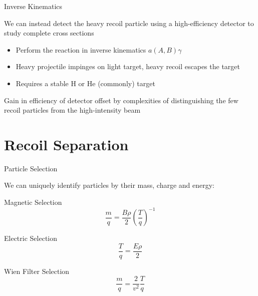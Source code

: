 \documentclass[10pt]{beamer}
\newcommand{\react}[4]{$#1(#2,#3)#4$}
\begin{document}
\begin{frame}[fragile]{Inverse Kinematics}

    We can instead detect the heavy recoil particle using a
    high-efficiency detector to study complete cross sections
    \begin{itemize}
        \item Perform the reaction in inverse kinematics
            \react{a}{A}{B}{\gamma}
        \item Heavy projectile impinges on light target, heavy recoil
            escapes the target
        \item Requires a stable H or He (commonly) target
    \end{itemize}

    Gain in efficiency of detector offset by complexities of
    distinguishing the few recoil particles from the high-intensity beam

\end{frame}

\section{Recoil Separation}

\begin{frame}[fragile]{Particle Selection}

    We can uniquely identify particles by their mass, charge and energy:

    \begin{alertblock}{Magnetic Selection}
        \[
            \frac{m}{q} = \frac{B\rho}{2}\left(\frac{T}{q}\right)^{-1}
        \]
    \end{alertblock}
    \begin{alertblock}{Electric Selection}
        \[
            \frac{T}{q} = \frac{E\rho}{2}
        \]
    \end{alertblock}
    \begin{alertblock}{Wien Filter Selection}
        \[
            \frac{m}{q} = \frac{2}{v^2} \frac{T}{q}
        \]
    \end{alertblock}


\end{frame}
\end{document}
